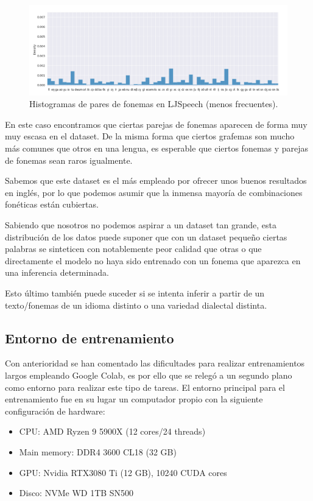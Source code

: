 \begin{figure}[H]
\centering
\includegraphics[width=14cm]{Z_anexos_img/ljs-3.png}
\caption{Histogramas de pares de fonemas en LJSpeech (menos frecuentes).}
\label{fig:figure1}
\end{figure}



En este caso encontramos que ciertas parejas de fonemas aparecen de forma muy muy escasa en el dataset. De la misma forma que ciertos grafemas son mucho más comunes que otros en una lengua, es esperable que ciertos fonemas y parejas de fonemas sean raros igualmente.

Sabemos que este dataset es el más empleado por ofrecer unos buenos resultados en inglés, por lo que podemos asumir que la inmensa mayoría de combinaciones fonéticas están cubiertas. 

Sabiendo que nosotros no podemos aspirar a un dataset tan grande, esta distribución de los datos puede suponer que con un dataset pequeño ciertas palabras se sinteticen con notablemente peor calidad que otras o que directamente el modelo no haya sido entrenado con un fonema que aparezca en una inferencia determinada.

Esto último también puede suceder si se intenta inferir a partir de un texto/fonemas de un idioma distinto o una variedad dialectal distinta.

\newpage 
\subsection{Entorno de entrenamiento}
\label{Entorno de entrenamiento}

Con anterioridad se han comentado las dificultades para realizar entrenamientos largos empleando Google Colab, es por ello que se relegó a un segundo plano como entorno para realizar este tipo de tareas. El entorno principal para el entrenamiento fue en su lugar un computador propio con la siguiente configuración de hardware:

\begin{itemize}
    \item CPU: AMD Ryzen 9 5900X (12 cores/24 threads)
    \item Main memory: DDR4 3600 CL18 (32 GB)
    \item GPU: Nvidia RTX3080 Ti (12 GB), 10240 CUDA cores
    \item Disco: NVMe WD 1TB SN500 
\end{itemize}

